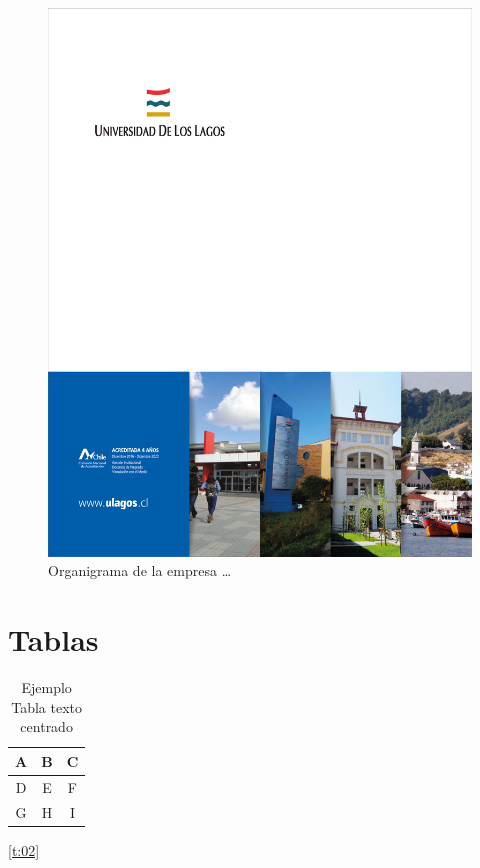 \begin{figure}[H]
\centering
 \includegraphics[scale=0.1]{portada}
  \caption{Organigrama de la empresa \dots}
\end{figure}

\section{Tablas}

\blindtext %

\begin{table}[H]
\centering
\begin{tabular}{|c|c|c|}\hline
  A&B &C \\
  \hline
  D&E &F \\
 G & H& I\\\hline
\end{tabular}
\caption{Ejemplo Tabla texto centrado}
\label{t:01}
\end{table}

\blindtext %
 \ref{t:02}

